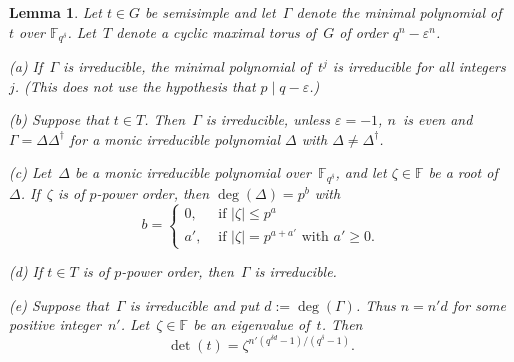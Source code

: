\documentclass[10pt,a4paper]{amsart}
\newtheorem{lem}{Lemma}
\begin{document}
\begin{lem}
\label{MinimalPolynomialAndDeterminant}
Let $t \in G$ be semisimple and let~$\Gamma$ denote the minimal polynomial 
of~$t$ over $\mathbb{F}_{q^{\delta}}$. Let~$T$ denote a cyclic maximal torus 
of~$G$ of order $q^n - \varepsilon^n$.

{\rm (a)} If~$\Gamma$ is irreducible, the minimal polynomial of~$t^j$ is 
irreducible for all integers~$j$. (This does not use the hypothesis
that $p \mid q - \varepsilon$.)

{\rm (b)} Suppose that $t \in T$. Then~$\Gamma$ is irreducible, unless 
$\varepsilon = -1$, $n$~is even and $\Gamma = \Delta\Delta^{\dagger}$ for a 
monic irreducible polynomial $\Delta$ with $\Delta \neq \Delta^{\dagger}$.

{\rm (c)} Let~$\Delta$ be a monic irreducible polynomial 
over~$\mathbb{F}_{q^{\delta}}$, and let $\zeta \in \mathbb{F}$ be a root 
of~$\Delta$. If~$\zeta$ is of $p$-power order, then
$\deg(\Delta) = p^b$ with
$$
b = \begin{cases} 0, & \text{\ if\ } |\zeta| \leq p^a \\
                    a', & \text{\ if\ } |\zeta| = p^{a + a'} \text{\ with\ } a' \geq 0.
\end{cases}
$$

{\rm (d)} If $t \in T$ is of $p$-power order, then~$\Gamma$ is irreducible.

{\rm (e)} Suppose that~$\Gamma$ is irreducible and put $d := \deg( \Gamma )$.
Thus $n = n' d$ for some positive integer~$n'$. Let~$\zeta \in \mathbb{F}$ be 
an eigenvalue of~$t$. Then
$$\det(t) = \zeta^{n'(q^{\delta d} -1)/(q^{\delta}-1)}.$$
\end{lem}
\end{document}
